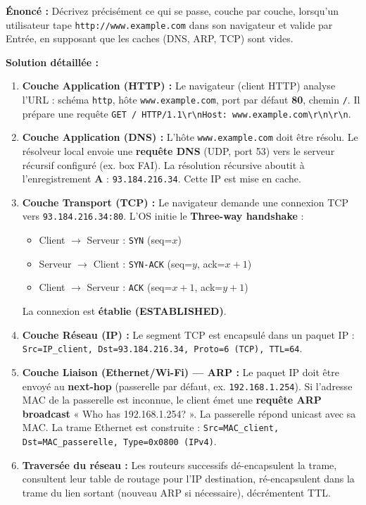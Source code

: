 \documentclass[11pt]{article}
\begin{document}
\begin{exoresolu}
\textbf{Énoncé :} Décrivez précisément ce qui se passe, couche par couche, lorsqu'un utilisateur tape \texttt{http://www.example.com} dans son navigateur et valide par Entrée, en supposant que les caches (DNS, ARP, TCP) sont vides.

\textbf{Solution détaillée :}

\begin{enumerate}
    \item \textbf{Couche Application (HTTP) :} Le navigateur (client HTTP) analyse l'URL : schéma \texttt{http}, hôte \texttt{www.example.com}, port par défaut \textbf{80}, chemin \texttt{/}. Il prépare une requête \verb|GET / HTTP/1.1\r\nHost: www.example.com\r\n\r\n|.
    \item \textbf{Couche Application (DNS) :} L'hôte \texttt{www.example.com} doit être résolu. Le résolveur local envoie une \textbf{requête DNS} (UDP, port 53) vers le serveur récursif configuré (ex. box FAI). La résolution récursive aboutit à l'enregistrement \textbf{A} : \texttt{93.184.216.34}. Cette IP est mise en cache.
    \item \textbf{Couche Transport (TCP) :} Le navigateur demande une connexion TCP vers \texttt{93.184.216.34:80}. L'OS initie le \textbf{Three-way handshake} :
        \begin{itemize}
            \item Client $\to$ Serveur : \texttt{SYN} (seq=$x$)
            \item Serveur $\to$ Client : \texttt{SYN-ACK} (seq=$y$, ack=$x+1$)
            \item Client $\to$ Serveur : \texttt{ACK} (seq=$x+1$, ack=$y+1$)
        \end{itemize}
        La connexion est \textbf{établie (ESTABLISHED)}.
    \item \textbf{Couche Réseau (IP) :} Le segment TCP est encapsulé dans un paquet IP : \texttt{Src=IP\_client, Dst=93.184.216.34, Proto=6 (TCP), TTL=64}.
    \item \textbf{Couche Liaison (Ethernet/Wi-Fi) — ARP :} Le paquet IP doit être envoyé au \textbf{next-hop} (passerelle par défaut, ex. \texttt{192.168.1.254}). Si l'adresse MAC de la passerelle est inconnue, le client émet une \textbf{requête ARP broadcast} « Who has 192.168.1.254? ». La passerelle répond unicast avec sa MAC. La trame Ethernet est construite : \texttt{Src=MAC\_client, Dst=MAC\_passerelle, Type=0x0800 (IPv4)}.
    \item \textbf{Traversée du réseau :} Les routeurs successifs dé-encapsulent la trame, consultent leur table de routage pour l'IP destination, ré-encapsulent dans la trame du lien sortant (nouveau ARP si nécessaire), décrémentent TTL.

\end{enumerate}
\end{exoresolu}
\end{document}
